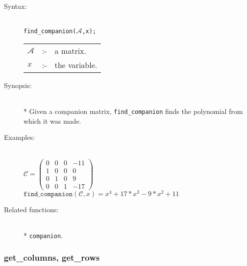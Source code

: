 \begin{description}
\item[Syntax:]\mbox{}\\
\texttt{find\_companion($\mathcal{A}$,x);}\\[2mm]
\begin{tabular}{l l l}
$\mathcal{A}$ &:-& a matrix. \\
$x$          &:-& the variable.
\end{tabular}

\item[Synopsis:]\mbox{}\\*
  Given a companion matrix, \texttt{find\_companion} finds the polynomial
from which it was made.

\item[Examples:]\mbox{}\\
  \(\mathcal{C} = \begin{pmatrix} 0 & 0 & 0 & -11 \\ 1 & 0 & 0 & 0
    \\ 0 & 1 & 0 & 9 \\ 0 & 0 & 1 & -17 \end{pmatrix}\) \\[2mm]
  \(\texttt{find\_companion}(\mathcal{C},x) = x^4+17*x^3-9*x^2+11\)

\item[Related functions:]\mbox{}\\*
\texttt{companion}.
\end{description}

\subsubsection{get\_columns, get\_rows}
\label{linalg:get_columns}

